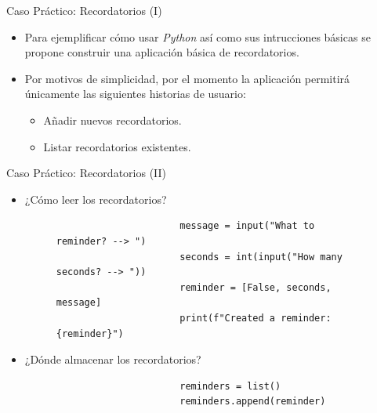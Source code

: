\documentclass{beamer}
\begin{document}
    \begin{frame}{Caso Práctico: Recordatorios (I)}
        \noindent
        \begin{minipage}{.69\textwidth}
          \begin{itemize}
            \item Para ejemplificar cómo usar \emph{Python} así como sus intrucciones básicas se propone construir una aplicación básica de recordatorios.
            \item Por motivos de simplicidad, por el momento la aplicación permitirá únicamente las siguientes historias de usuario:
              \begin{itemize}
                \item Añadir nuevos recordatorios.
                \item Listar recordatorios existentes.
              \end{itemize}
          \end{itemize}
        \end{minipage}
        \begin{minipage}{.29\textwidth}
            \begin{center}
              \fontsize{40}{50}
            \end{center}
        \end{minipage}
    \end{frame}

    \begin{frame}[fragile]{Caso Práctico: Recordatorios (II)}
        \begin{itemize}
          \item ¿Cómo leer los recordatorios?
            \begin{figure}
              \begin{minipage}[c]{0.7\textwidth}
                  \begin{verbatim}
                      message = input("What to reminder? --> ")
                      seconds = int(input("How many seconds? --> "))
                      reminder = [False, seconds, message]
                      print(f"Created a reminder: {reminder}")
                  \end{verbatim}
                \end{minipage}
            \end{figure}
          \item ¿Dónde almacenar los recordatorios?
          \begin{figure}
              \begin{minipage}[c]{0.7\textwidth}
                  \begin{verbatim}
                      reminders = list()
                      reminders.append(reminder)
                  \end{verbatim}
              \end{minipage}
          \end{figure}
        \end{itemize}
    \end{frame}
\end{document}
